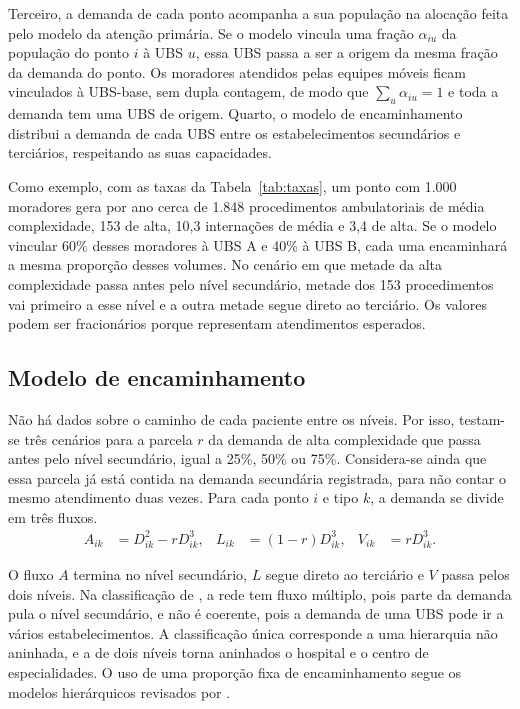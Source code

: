 \documentclass[12pt,a4paper,oneside]{report}
\begin{document}
Terceiro, a demanda de cada ponto acompanha a sua população na alocação feita pelo modelo da atenção
primária. Se o modelo vincula uma fração $\alpha_{iu}$ da população do ponto $i$ à UBS $u$, essa UBS
passa a ser a origem da mesma fração da demanda do ponto. Os moradores atendidos pelas equipes móveis
ficam vinculados à UBS-base, sem dupla contagem, de modo que $\sum_u\alpha_{iu}=1$ e toda a demanda tem
uma UBS de origem. Quarto, o modelo de encaminhamento distribui a demanda de cada UBS entre os
estabelecimentos secundários e terciários, respeitando as suas capacidades.

Como exemplo, com as taxas da Tabela~\ref{tab:taxas}, um ponto com 1.000 moradores gera por ano cerca de 1.848 procedimentos ambulatoriais de
média complexidade, 153 de alta, 10,3 internações de média e 3,4 de alta. Se o modelo vincular 60\%
desses moradores à UBS A e 40\% à UBS B, cada uma encaminhará a mesma proporção desses volumes. No
cenário em que metade da alta complexidade passa antes pelo nível secundário, metade dos 153
procedimentos vai primeiro a esse nível e a outra metade segue direto ao terciário. Os valores podem
ser fracionários porque representam atendimentos esperados.

\subsection{Modelo de encaminhamento}
Não há dados sobre o caminho de cada paciente entre os níveis. Por isso, testam-se três cenários para a
parcela $r$ da demanda de alta complexidade que passa antes pelo nível secundário, igual a 25\%, 50\% ou
75\%. Considera-se ainda que essa parcela já está contida na demanda secundária registrada, para não
contar o mesmo atendimento duas vezes. Para cada ponto $i$ e tipo $k$,
a demanda se divide em três fluxos.
\begin{align}
A_{ik}&=D^2_{ik}-rD^3_{ik},&L_{ik}&=(1-r)D^3_{ik},&V_{ik}&=rD^3_{ik}.
\end{align}

O fluxo $A$ termina no nível secundário, $L$ segue direto ao terciário e $V$ passa pelos dois níveis. Na
classificação de \citet{sahin2007}, a rede tem fluxo múltiplo, pois parte da demanda pula o nível
secundário, e não é coerente, pois a demanda de uma UBS pode ir a vários estabelecimentos. A classificação
única corresponde a uma hierarquia não aninhada, e a de dois níveis torna aninhados o hospital e o centro
de especialidades. O uso de uma proporção fixa de encaminhamento segue os modelos
hierárquicos revisados por \citet{narula1986}.
\end{document}
